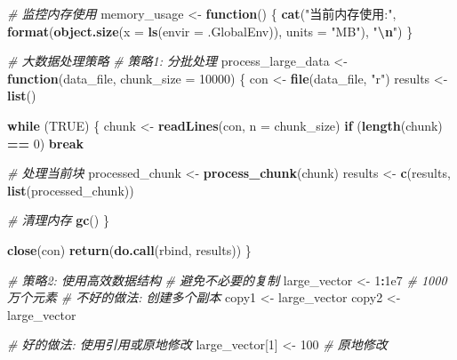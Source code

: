 \documentclass[
]{book}
\newenvironment{Shaded}{\begin{snugshade}}{\end{snugshade}}
\newcommand{\AttributeTok}[1]{\textcolor[rgb]{0.13,0.29,0.53}{#1}}
\newcommand{\CommentTok}[1]{\textcolor[rgb]{0.56,0.35,0.01}{\textit{#1}}}
\newcommand{\ConstantTok}[1]{\textcolor[rgb]{0.56,0.35,0.01}{#1}}
\newcommand{\ControlFlowTok}[1]{\textcolor[rgb]{0.13,0.29,0.53}{\textbf{#1}}}
\newcommand{\DecValTok}[1]{\textcolor[rgb]{0.00,0.00,0.81}{#1}}
\newcommand{\FloatTok}[1]{\textcolor[rgb]{0.00,0.00,0.81}{#1}}
\newcommand{\FunctionTok}[1]{\textcolor[rgb]{0.13,0.29,0.53}{\textbf{#1}}}
\newcommand{\NormalTok}[1]{#1}
\newcommand{\OtherTok}[1]{\textcolor[rgb]{0.56,0.35,0.01}{#1}}
\newcommand{\SpecialCharTok}[1]{\textcolor[rgb]{0.81,0.36,0.00}{\textbf{#1}}}
\newcommand{\StringTok}[1]{\textcolor[rgb]{0.31,0.60,0.02}{#1}}
\begin{document}
\begin{Shaded}
\begin{Highlighting}[]
\CommentTok{\# 监控内存使用}
\NormalTok{memory\_usage }\OtherTok{\textless{}{-}} \ControlFlowTok{function}\NormalTok{() \{}
  \FunctionTok{cat}\NormalTok{(}\StringTok{"当前内存使用:"}\NormalTok{, }\FunctionTok{format}\NormalTok{(}\FunctionTok{object.size}\NormalTok{(}\AttributeTok{x =} \FunctionTok{ls}\NormalTok{(}\AttributeTok{envir =}\NormalTok{ .GlobalEnv)), }\AttributeTok{units =} \StringTok{"MB"}\NormalTok{), }\StringTok{"}\SpecialCharTok{\textbackslash{}n}\StringTok{"}\NormalTok{)}
\NormalTok{\}}

\CommentTok{\# 大数据处理策略}
\CommentTok{\# 策略1: 分批处理}
\NormalTok{process\_large\_data }\OtherTok{\textless{}{-}} \ControlFlowTok{function}\NormalTok{(data\_file, }\AttributeTok{chunk\_size =} \DecValTok{10000}\NormalTok{) \{}
\NormalTok{  con }\OtherTok{\textless{}{-}} \FunctionTok{file}\NormalTok{(data\_file, }\StringTok{"r"}\NormalTok{)}
\NormalTok{  results }\OtherTok{\textless{}{-}} \FunctionTok{list}\NormalTok{()}

  \ControlFlowTok{while}\NormalTok{ (}\ConstantTok{TRUE}\NormalTok{) \{}
\NormalTok{    chunk }\OtherTok{\textless{}{-}} \FunctionTok{readLines}\NormalTok{(con, }\AttributeTok{n =}\NormalTok{ chunk\_size)}
    \ControlFlowTok{if}\NormalTok{ (}\FunctionTok{length}\NormalTok{(chunk) }\SpecialCharTok{==} \DecValTok{0}\NormalTok{) }\ControlFlowTok{break}

    \CommentTok{\# 处理当前块}
\NormalTok{    processed\_chunk }\OtherTok{\textless{}{-}} \FunctionTok{process\_chunk}\NormalTok{(chunk)}
\NormalTok{    results }\OtherTok{\textless{}{-}} \FunctionTok{c}\NormalTok{(results, }\FunctionTok{list}\NormalTok{(processed\_chunk))}

    \CommentTok{\# 清理内存}
    \FunctionTok{gc}\NormalTok{()}
\NormalTok{  \}}

  \FunctionTok{close}\NormalTok{(con)}
  \FunctionTok{return}\NormalTok{(}\FunctionTok{do.call}\NormalTok{(rbind, results))}
\NormalTok{\}}

\CommentTok{\# 策略2: 使用高效数据结构}
\CommentTok{\# 避免不必要的复制}
\NormalTok{large\_vector }\OtherTok{\textless{}{-}} \DecValTok{1}\SpecialCharTok{:}\FloatTok{1e7}  \CommentTok{\# 1000万个元素}
\CommentTok{\# 不好的做法: 创建多个副本}
\NormalTok{copy1 }\OtherTok{\textless{}{-}}\NormalTok{ large\_vector}
\NormalTok{copy2 }\OtherTok{\textless{}{-}}\NormalTok{ large\_vector}

\CommentTok{\# 好的做法: 使用引用或原地修改}
\NormalTok{large\_vector[}\DecValTok{1}\NormalTok{] }\OtherTok{\textless{}{-}} \DecValTok{100}  \CommentTok{\# 原地修改}
\end{Highlighting}
\end{Shaded}
\end{document}
